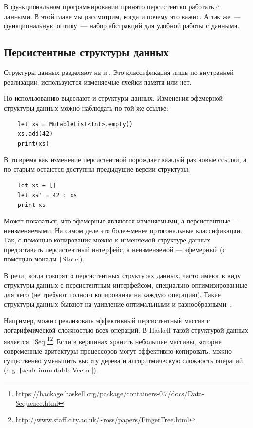 
В функциональном программировании принято персистентно работать с данными.
В этой главе мы рассмотрим, когда и почему это важно.
А так же~--- функциональную оптику~--- набор абстракций для удобной работы с данными.

\subsection{Персистентные структуры данных}

Структуры данных разделяют на  и .
Это классификация лишь по внутренней реализации, используются изменяемые ячейки памяти или нет.

По использованию выделают  и  структуры данных. %
Изменения эфемерной структуры данных можно наблюдать по той же ссылке:
\begin{verbatim}
    let xs = MutableList<Int>.empty()
    xs.add(42)
    print(xs)
\end{verbatim}
В то время как изменение персистентной порождает каждый раз новые ссылки, а по старым остаются доступны предыдущие версии структуры:
\begin{verbatim}
    let xs = []
    let xs' = 42 : xs
    print xs
\end{verbatim}

Может показаться, что эфемерные являются изменяемыми, а персистентные --- неизменяемыми.
На самом деле это более-менее ортогональные классификации.
Так, с помощью копирования можно к изменяемой структуре данных предоставить персистентный интерфейс, а неизменяемой --- эфемерный (с помощью монады \texttt|State|).

В речи, когда говорят о персистентных структурах данных, часто имеют в виду структуры данных с персистентным интерфейсом, специально оптимизированные для него (не требуют полного копирования на каждую операцию).
Такие структуры данных бывают на удивление оптимальными и разнообразными~\cite{okasaki1999purely}.

Например, можно реализовать эффективный персистентный массив с логарифмической сложностью всех операций.
В Haskell такой структурой данных является \texttt|Seq|\footnote{\url{https://hackage.haskell.org/package/containers-0.7/docs/Data-Sequence.html}}\footnote{\url{http://www.staff.city.ac.uk/~ross/papers/FingerTree.html}}.
Если в вершинах хранить небольшие массивы, которые современные аритектуры процессоров могут эффективно копировать, можно существенно уменьшить высоту дерева и алгоритмическую сложность операций (e.g. \texttt|scala.immutable.Vector|).


